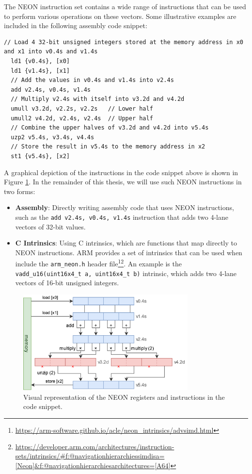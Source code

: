 \documentclass[11pt,a4paper]{report}
\theoremstyle{definition}
\begin{document}
The NEON instruction set contains a wide range of instructions that can be used to perform various operations on these vectors. Some illustrative examples are included in the following assembly code snippet:

\begin{lstlisting}[language={[x86masm]Assembler}, style=ASMStyle]
  // Load 4 32-bit unsigned integers stored at the memory address in x0 and x1 into v0.4s and v1.4s
  ld1 {v0.4s}, [x0]
  ld1 {v1.4s}, [x1]
  // Add the values in v0.4s and v1.4s into v2.4s
  add v2.4s, v0.4s, v1.4s
  // Multiply v2.4s with itself into v3.2d and v4.2d
  umull v3.2d, v2.2s, v2.2s   // Lower half
  umull2 v4.2d, v2.4s, v2.4s  // Upper half
  // Combine the upper halves of v3.2d and v4.2d into v5.4s
  uzp2 v5.4s, v3.4s, v4.4s
  // Store the result in v5.4s to the memory address in x2
  st1 {v5.4s}, [x2]
\end{lstlisting}

A graphical depiction of the instructions in the code snippet above is shown in Figure \ref{fig:neonexample}. In the remainder of this thesis, we will use such NEON instructions in two forms:
\begin{itemize}
  \item \textbf{Assembly}: Directly writing assembly code that uses NEON instructions, such as the \texttt{add v2.4s, v0.4s, v1.4s} instruction that adds two 4-lane vectors of 32-bit values.
  \item \textbf{C Intrinsics}: Using C intrinsics, which are functions that map directly to NEON instructions. ARM provides a set of intrinsics that can be used when include the \texttt{arm\_neon.h} header file\footnote{\url{https://arm-software.github.io/acle/neon\_intrinsics/advsimd.html}}\footnote{\url{https://developer.arm.com/architectures/instruction-sets/intrinsics/\#f:@navigationhierarchiessimdisa=[Neon]\&f:@navigationhierarchiesarchitectures=[A64]}}. An example is the \texttt{vadd\_u16(uint16x4\_t a, uint16x4\_t b)} intrinsic, which adds two 4-lane vectors of 16-bit unsigned integers.
\end{itemize}

\begin{figure}
  \centering
  \includegraphics[width=0.8\textwidth]{neon/neon_example.drawio.png}
  \caption{Visual representation of the NEON registers and instructions in the code snippet.}
  \label{fig:neonexample}
\end{figure}
\end{document}
